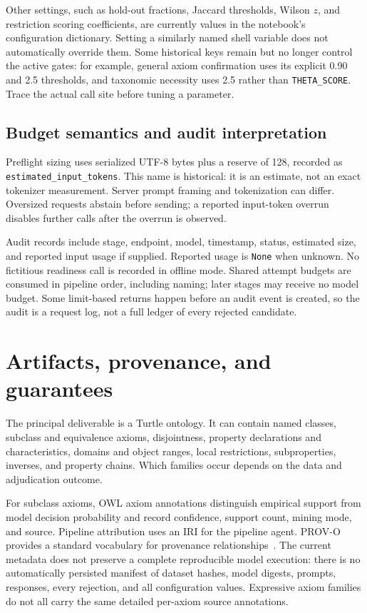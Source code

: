 \documentclass[11pt,a4paper]{article}
\newcommand{\code}[1]{\nolinkurl{#1}}
\begin{document}
Other settings, such as hold-out fractions, Jaccard thresholds, Wilson $z$, and
restriction scoring coefficients, are currently values in the notebook's
configuration dictionary. Setting a similarly named shell variable does not
automatically override them. Some historical keys remain but no longer control
the active gates: for example, general axiom confirmation uses its explicit 0.90
and 2.5 thresholds, and taxonomic necessity uses 2.5 rather than
\code{THETA_SCORE}. Trace the actual call site before tuning a parameter.

\subsection{Budget semantics and audit interpretation}
Preflight sizing uses serialized UTF-8 bytes plus a reserve of 128, recorded as
\code{estimated_input_tokens}. This name is historical: it is an estimate, not
an exact tokenizer measurement. Server prompt framing and tokenization can differ.
Oversized requests abstain before sending; a reported input-token overrun disables
further calls after the overrun is observed.

Audit records include stage, endpoint, model, timestamp, status, estimated size,
and reported input usage if supplied. Reported usage is \code{None} when unknown.
No fictitious readiness call is recorded in offline mode. Shared attempt budgets
are consumed in pipeline order, including naming; later stages may receive no
model budget. Some limit-based returns happen before an audit event is created,
so the audit is a request log, not a full ledger of every rejected candidate.

\section{Artifacts, provenance, and guarantees}\label{sec:artifacts}

The principal deliverable is a Turtle ontology. It can contain named classes,
subclass and equivalence axioms, disjointness, property declarations and
characteristics, domains and object ranges, local restrictions, subproperties,
inverses, and property chains. Which families occur depends on the data and
adjudication outcome.

For subclass axioms, OWL axiom annotations distinguish empirical support from
model decision probability and record confidence, support count, mining mode,
and source. Pipeline attribution uses an IRI for the pipeline agent. PROV-O
provides a standard vocabulary for provenance relationships~\cite{prov}.
The current metadata does not preserve a complete reproducible model execution:
there is no automatically persisted manifest of dataset hashes, model digests,
prompts, responses, every rejection, and all configuration values. Expressive
axiom families do not all carry the same detailed per-axiom source annotations.
\end{document}
